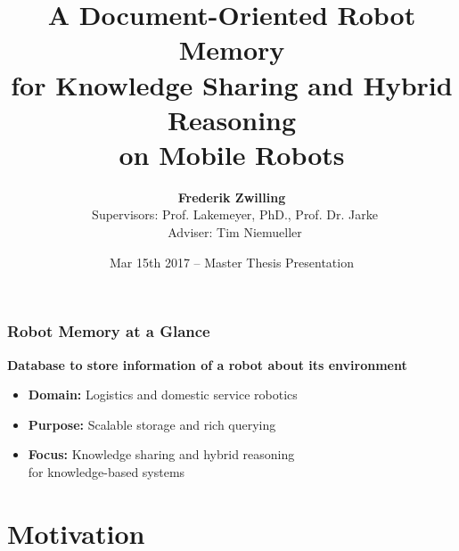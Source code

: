 




\usepackage{todonotes}
\usepackage{booktabs}
\newcommand{\tabitem}{~~\llap{\textcolor{FawkesOrange}{\textbullet}}~~}



\title[Robot Memory] {A Document-Oriented Robot Memory\\ for
  Knowledge Sharing and Hybrid Reasoning\\ on Mobile Robots}
\author[Zwilling]{
  \textbf{Frederik Zwilling}\\
  ~Supervisors: Prof. Lakemeyer, PhD., Prof. Dr. Jarke\\
  ~Adviser: Tim Niemueller
}
\def\projecturl{}

\date[Mar 15th 2017]{Mar 15th 2017 -- Master Thesis Presentation}



\frame[plain]{\titlepage}
\addtocounter{framenumber}{-1}

\begin{frame}[plain]
  \frametitle{Robot Memory at a Glance}
  \textbf{\large Database to store information of a robot about its environment}
  \bigskip
  \begin{itemize}
  \item \textbf{Domain:} Logistics and domestic service robotics
  \item \textbf{Purpose:} Scalable storage and rich querying
  \item \textbf{Focus:} Knowledge sharing and hybrid reasoning\\ for knowledge-based systems
  \end{itemize}
\end{frame}

\addtocounter{framenumber}{-1}

\section{Motivation}

